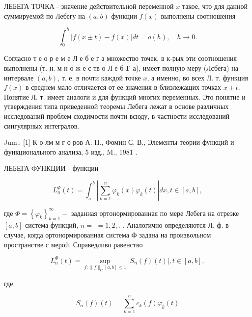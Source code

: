 \documentclass[10pt]{article}
\begin{document}
ЛЕБЕГА ТОЧКА - значение действительной переменной $x$ такое, что для данной суммируемой по Лебегу на $(a, b)$ функции $f(x)$ выполнены соотношения



\[

\int_{0}^{h}|f(x \pm t)-f(x)| d t=o(h), \quad h \longrightarrow 0 .

\]



Согласно т е о р е м е Л е б е г а множество точек, в к-рых эти соотношения выполнены (т. н. м н о ж е с тв о Л е б $\boldsymbol{\Gamma}$ а), имеет полную меру (Лсбега) на интервале $(a, b)$, т. е. в почти каждой точке $x$, а именно, во всех Л. т. функция $f(x)$ в среднем мало отличается от ее значения в близлежащих точках $x \pm t$. Понятие Л. т. имеет аналоги и для функций многих переменных. Это понятие и утверждения типа приведенной теоремы Лебега лежат в основе различных исследований проблем сходимости почти всюду, в частности исследований сингулярных интегралов.



Jum.: [1] К о лм м г о ров А. Н., Фомин С. В., Элементы теории функций и функционального анализа, 5 изд., M., 1981 .



ЛЕБЕГА ФУНКЦИИ - функции



\[

L_{n}^{\Phi}(t)=\int_{a}^{b}\left|\sum_{k=1}^{n} \varphi_{k}(x) \varphi_{k}(t)\right| d x, t \in[a, b],

\]



где $\Phi=\left\{\varphi_{k}\right\}_{k=1}^{\infty}-$ заданная ортонормированная по мере Лебега на отрезке $[a, b]$ система функций, $n=$ $=1,2,$. . Аналогично определяются Л. ф. в случае, когда ортонормированная система Ф задана на произвольном пространстве с мерой. Справедливо равенство



\[

L_{n}^{\Phi}(t)=\sup _{f:\|f\|_{C}[a, b] \leqslant 1}\left|S_{n}(f)(t)\right|, t \in[a, b],

\]



где



\[

S_{n}(f)(t)=\sum_{k=1}^{n} c_{k}(f) \varphi_{k}(t)

\]
\end{document}
